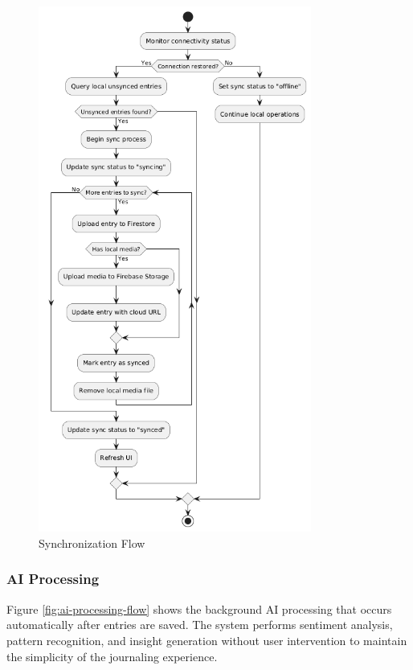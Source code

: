 \begin{figure}[H]
\centering
\includegraphics[width=0.8\textwidth]{files/imgs/sync_flow.png}
\caption{Synchronization Flow}
\label{fig:sync-flow}
\end{figure}

\subsubsection{AI Processing}\label{subsubsec:aiProcessing}

Figure \ref{fig:ai-processing-flow} shows the background AI processing that occurs automatically after entries are saved. The system performs sentiment analysis, pattern recognition, and insight generation without user intervention to maintain the simplicity of the journaling experience.

